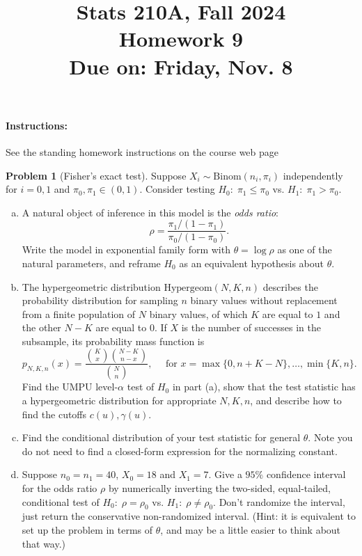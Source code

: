 \documentclass{article}
\theoremstyle{definition}
\newtheorem{problem}{Problem}
\begin{document}
\title{Stats 210A, Fall 2024\\
  Homework 9 \\
  {\large {\bf Due on}: Friday, Nov. 8}}
\date{}

\maketitle

\paragraph{Instructions:} See the standing homework instructions on the course web page


\begin{problem}[Fisher's exact test]
\label{prob:fisher-exact}
Suppose $X_i \sim \text{Binom}(n_i, \pi_i)$ independently for $i=0,1$ and $\pi_0,\pi_1\in(0,1)$. Consider testing $H_0:\; \pi_1\leq \pi_0$ vs. $H_1:\; \pi_1 > \pi_0$.

\begin{enumerate}[(a)]
\item  A natural object of inference in this model is the {\em odds ratio}:
\[
\rho = \frac{\pi_1/(1-\pi_1)}{\pi_0/(1-\pi_0)}.
\]
Write the model in exponential family form with $\theta=\log\rho$ as one of the natural parameters, and reframe $H_0$ as an equivalent hypothesis about $\theta$.



\item  The hypergeometric distribution $\text{Hypergeom}(N,K,n)$ describes the probability distribution for sampling $n$ binary values without replacement from a finite population of $N$ binary values, of which $K$ are equal to $1$ and the other $N-K$ are equal to $0$. If $X$ is the number of successes in the subsample, its probability mass function is
\[
p_{N,K,n}(x) = \frac{\binom{K}{x}\binom{N-K}{n-x}}{\binom{N}{n}}, \quad \text{ for } x = \max\{0,n+K-N\}, \ldots, \min\{K,n\}.
\]
Find the UMPU level-$\alpha$ test of $H_0$ in part (a), show that the test statistic has a hypergeometric distribution for appropriate $N,K,n$, and describe how to find the cutoffs $c(u), \gamma(u)$.



\item Find the conditional distribution of your test statistic for general $\theta$. Note you do not need to find a closed-form expression for the normalizing constant.

\item Suppose $n_0=n_1=40$, $X_0=18$ and $X_1=7$. Give a $95\%$ confidence interval for the odds ratio $\rho$ by numerically inverting the two-sided,
equal-tailed, conditional test of $H_0:\; \rho=\rho_0$ vs. $H_1:\; \rho \neq \rho_0$. Don't randomize the interval, just return the conservative non-randomized interval. (Hint: it is equivalent to set up the problem in terms of $\theta$, and may be a little easier to think about that way.)



\end{enumerate}
\end{problem}
\end{document}
